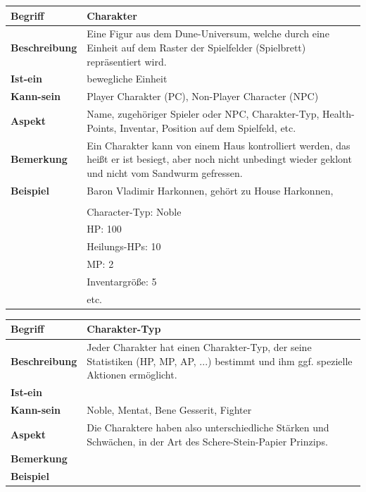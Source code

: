 \documentclass[12pt]{article}
\begin{document}
\begin{tabularx}{\linewidth}{|l|X|}
\hline
\textbf{Begriff} & \textbf{Charakter} \\
\hline
\textbf{Beschreibung} & Eine Figur aus dem Dune-Universum, welche durch eine Einheit auf dem Raster der Spielfelder (Spielbrett) repräsentiert wird. \\
\hline
\textbf{Ist-ein} & bewegliche Einheit \\
\hline
\textbf{Kann-sein} & Player Charakter (PC), Non-Player Character (NPC) \\
\hline
\textbf{Aspekt} & Name, zugehöriger Spieler oder NPC, Charakter-Typ, Health-Points, Inventar, Position auf dem Spielfeld, etc. \\
\hline
\textbf{Bemerkung} & Ein Charakter kann von einem Haus kontrolliert werden, das heißt er ist besiegt, aber noch nicht unbedingt wieder geklont und nicht vom Sandwurm gefressen. \\
\hline
\textbf{Beispiel} & Baron Vladimir Harkonnen, gehört zu House Harkonnen, \\
\\
& Character-Typ: Noble \\
& HP: 100 \\
& Heilungs-HPs: 10 \\
& MP: 2 \\
& Inventargröße: 5 \\
& etc. \\
\hline
\end{tabularx}

\begin{tabularx}{\linewidth}{|l|X|}
\hline
\textbf{Begriff} & \textbf{Charakter-Typ} \\
\hline
\textbf{Beschreibung} & Jeder Charakter hat einen Charakter-Typ, der seine Statistiken (HP, MP, AP, ...) bestimmt und ihm ggf. spezielle Aktionen ermöglicht. \\
\hline
\textbf{Ist-ein} & \\
\hline
\textbf{Kann-sein} & Noble, Mentat, Bene Gesserit, Fighter\\
\hline
\textbf{Aspekt} & Die Charaktere haben also unterschiedliche Stärken und Schwächen, in der Art des Schere-Stein-Papier Prinzips.\\
\hline
\textbf{Bemerkung} &  \\
\hline
\textbf{Beispiel} &  \\
\hline
\end{tabularx}
\end{document}
